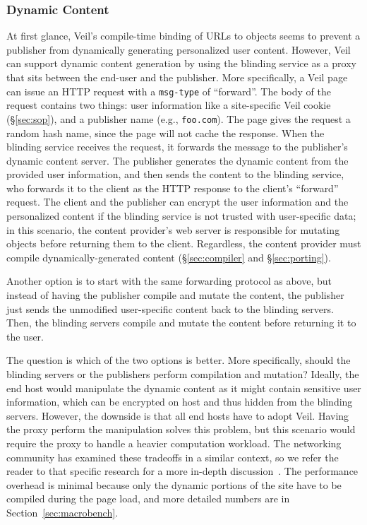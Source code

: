 \subsubsection{Dynamic Content}
\label{sec:dynamic}

At first glance, Veil's compile-time binding of
URLs to objects seems to prevent a publisher
from dynamically generating personalized user
content. However, Veil can support dynamic
content generation by using the blinding
service as a proxy that sits between the
end-user and the publisher. More specifically,
a Veil page can issue an HTTP request with
a \texttt{msg-type} of ``forward''. The body
of the request contains two things: user information
like a site-specific Veil cookie (\S\ref{sec:sop}),
and a publisher name (e.g., \texttt{foo.com}).
The page gives the request a random hash name,
since the page will not cache the response.
When the blinding service receives the request,
it forwards the message to the publisher's
dynamic content server. The publisher generates
the dynamic content from the provided user
information, and then sends the content to the
blinding service, who forwards it to the client
as the HTTP response to the client's ``forward''
request. The client and the publisher can encrypt
the user information and the personalized content
if the blinding service is not trusted with
user-specific data; in this scenario, the content provider's web server
is responsible for mutating objects before returning
them to the client. Regardless, the content provider
must compile dynamically-generated content (\S\ref{sec:compiler}
and \S\ref{sec:porting}).

Another option is to start with the same forwarding
protocol as above, but instead of having
the publisher compile and mutate the content, the 
publisher just sends the unmodified user-specific
content back to the blinding servers. Then, the blinding
servers compile and mutate the content before
returning it to the user. 

The question is which of the two options is better. 
More specifically, should the blinding servers
or the publishers perform compilation and mutation?
Ideally, the end host
would manipulate the dynamic content as it might
contain sensitive user information, which can be 
encrypted on host and thus hidden from the blinding servers.
However, the downside is that all end hosts have to 
adopt Veil. Having the proxy perform the manipulation
solves this problem, but this scenario would
require the proxy to handle a heavier computation workload.
The networking community
has examined these tradeoffs in a similar context, 
so we refer the reader to that specific research for a more in-depth
discussion~\cite{flywheel,polaris}.
The performance overhead is minimal because only the dynamic
portions of the site have to be compiled during the page load, 
and more detailed numbers are in Section~\ref{sec:macrobench}.

